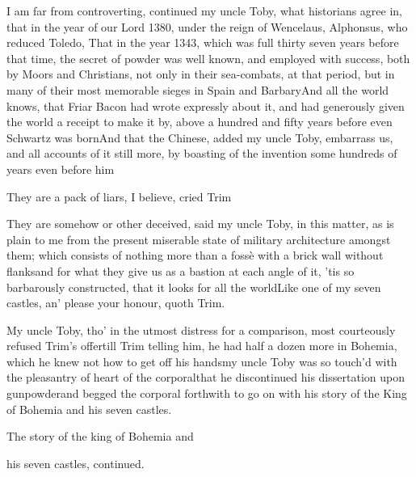 \documentclass{article}
\begin{document}
I am far from controverting, conti\-nued my uncle Toby,
what historians agree in, that in the year of our Lord 1380, under
the reign of Wencelaus, 
Alphonsus, who reduced Toledo, That in the year
1343, which was full thirty seven years before that time, the secret of powder was
well known, and employed with success, both by Moors and Christians, not only in
their sea-combats, at that period, but in many of their most memorable sieges in
Spain and Barbary\tsk\break And all the world knows, that Friar Bacon had wrote expressly
about it, and had generously given the world a receipt to make it by, above a
hundred and fifty years before even Schwartz was born\tsk And that the Chinese,
added my uncle Toby, embarrass us, and all accounts of it still more, by boasting
of the invention some hundreds of years even before him\tsh

\tsk They are a pack of liars, I believe, cried
Trim\tsh{}

\tsh They are somehow or other deceived, said my uncle
Toby, in this matter, as is plain to me from the present
miserable state of military architecture amongst them; which
consists of nothing more than a fossè with a brick wall without
flanks\tsk and for what they give us as a bastion at each angle
of it, ’tis so barbarously constructed, that it looks for all
the world\tsh \tsh Like one of my seven
castles, an’ please your honour, quoth Trim.

My uncle Toby, tho’ in the utmost distress for a
comparison, most courteously refused Trim’s
offer\tsk till Trim telling him, he had half a dozen more
in Bohemia, which he knew not how to get off his
hands\tsh my uncle Toby was so touch’d with
the pleasantry of heart of the corporal\tsh that he
discontinued his dissertation upon gunpowder\tsh and
begged the corporal forthwith to go on with his story of the King
of Bohemia and his seven castles.

\bigskip
\centerline{The story of the king of Bohemia and}
\centerline{his seven castles, continued.}
\end{document}
